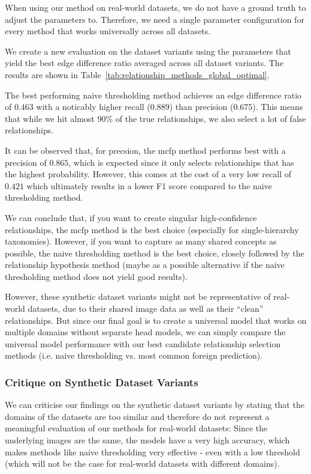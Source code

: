 When using our method on real-world datasets,
we do not have a ground truth to adjust the parameters to.
Therefore, we need a single parameter configuration for every method
that works universally across all datasets.

We create a new evaluation on the dataset variants using the parameters
that yield the best edge difference ratio averaged across all dataset variants.
The results are shown in Table~\ref{tab:relationship_methods_global_optimal}.

The best performing naive thresholding method
achieves an edge difference ratio of $0.463$
with a noticably higher recall ($0.889$) than precision ($0.675$).
This means that while we hit almost 90\% of the true relationships,
we also select a lot of false relationships.

It can be observed that, for precsion, the mcfp method performs best
with a precision of $0.865$,
which is expected since it only selects relationships
that has the highest probability.
However, this comes at the cost of a very low recall of $0.421$
which ultimately results in a lower F1 score compared to the naive thresholding method.

We can conclude that, if you want to create singular high-confidence relationships,
the mcfp method is the best choice (especially for single-hierarchy taxonomies).
However, if you want to capture as many shared concepts as possible,
the naive thresholding method is the best choice, closely followed by the relationship hypothesis method
(maybe as a possible alternative if the naive thresholding method does not yield good results).



However, these synthetic dataset variants might not be representative of real-world datasets,
due to their shared image data as well as their \enquote{clean} relationships.
But since our final goal is to create a universal model that works on multiple domains
without separate head models, we can simply compare the universal model performance
with our best candidate relationship selection methods
(i.e. naive thresholding vs. most common foreign prediction).

\subsubsection{Critique on Synthetic Dataset Variants}

We can criticise our findings on the synthetic dataset variants
by stating that the domains of the datasets are too similar
and therefore do not represent a meaningful evaluation of our methods
for real-world datasets:
Since the underlying images are the same, the models have a very high accuracy,
which makes methods like naive thresholding very effective - even with a low threshold
(which will not be the case for real-world datasets with different domains).


